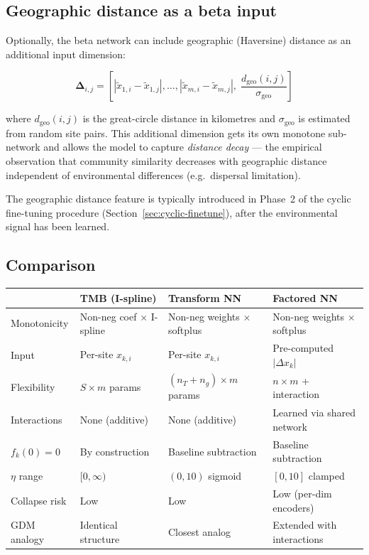 \documentclass{article}
\begin{document}
\subsection{Geographic distance as a beta input}

Optionally, the beta network can include geographic (Haversine) distance as an additional input dimension:

\begin{equation}
    \bm{\Delta}_{i,j} = \left[|\tilde{x}_{1,i} - \tilde{x}_{1,j}|, \ldots, |\tilde{x}_{m,i} - \tilde{x}_{m,j}|, \; \frac{d_{\text{geo}}(i,j)}{\sigma_{\text{geo}}}\right]
\end{equation}

where $d_{\text{geo}}(i,j)$ is the great-circle distance in kilometres and $\sigma_{\text{geo}}$ is estimated from random site pairs. This additional dimension gets its own monotone sub-network and allows the model to capture \textit{distance decay} --- the empirical observation that community similarity decreases with geographic distance independent of environmental differences (e.g.\ dispersal limitation).

The geographic distance feature is typically introduced in Phase~2 of the cyclic fine-tuning procedure (Section~\ref{sec:cyclic-finetune}), after the environmental signal has been learned.

\subsection{Comparison}

\begin{center}
\small
\begin{tabular}{l|l|l|l}
    & TMB (I-spline) & Transform NN & Factored NN \\
    \hline
    Monotonicity & Non-neg coef $\times$ I-spline & Non-neg weights $\times$ softplus & Non-neg weights $\times$ softplus \\
    Input & Per-site $x_{k,i}$ & Per-site $x_{k,i}$ & Pre-computed $|\Delta x_k|$ \\
    Flexibility & $S \times m$ params & $(n_T + n_g) \times m$ params & $n \times m$ + interaction \\
    Interactions & None (additive) & None (additive) & Learned via shared network \\
    $f_k(0) = 0$ & By construction & Baseline subtraction & Baseline subtraction \\
    $\eta$ range & $[0, \infty)$ & $(0, 10)$ sigmoid & $[0, 10]$ clamped \\
    Collapse risk & Low & Low & Low (per-dim encoders) \\
    GDM analogy & Identical structure & Closest analog & Extended with interactions \\
\end{tabular}
\end{center}
\end{document}
